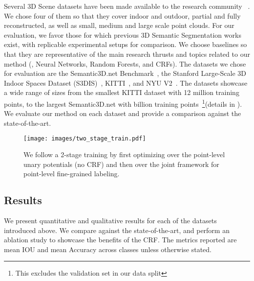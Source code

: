 \documentclass[10pt,twocolumn,letterpaper]{article}
\newcommand{\fccrf}[0]{CRF\xspace}
\begin{document}
Several 3D Scene datasets have been made available to the research community ~\cite{Riemenschneider2014,armeni2017,Armeni2016, scenenn-3dv16, Song2015,Xiao2013,Silberman:ECCV12,dai2017scannet,kitchen2016, catdata2013}. We chose four of them so that they cover indoor and outdoor, partial and fully reconstructed, as well as small, medium and large scale point clouds. For our evaluation, we favor those for which previous 3D Semantic Segmentation works exist, with replicable experimental setups for comparison. We choose baselines so that they are representative of the main research thrusts and topics related to our method (\ie, Neural Networks, Random Forests, and CRFs). The datasets we chose for evaluation are the Semantic3D.net Benchmark~\cite{l3d},
the Stanford Large-Scale 3D Indoor Spaces Dataset (S3DIS)~\cite{Armeni2016},  KITTI~\cite{Geiger2013IJRR,Geiger:2012:WRA:2354409.2354978}, and NYU V2~\cite{Silberman:ECCV12}.
The datasets showcase a wide range of sizes from the smallest
KITTI dataset with 12 million
training points, to the largest Semantic3D.net with  billion training points~\footnote{This excludes the validation set in our data split}(details in \cite{segcloudsuppl}). We evaluate our method on each dataset and provide a comparison against the state-of-the-art.


\begin{figure}[t]
\centering
\texttt{[image: images/two\_stage\_train.pdf]}
\caption{\small{We follow a 2-stage training by first optimizing over the point-level unary potentials (no CRF) and then over the joint framework for point-level fine-grained labeling.}}
\label{fig:training_stages}
\vspace{-4mm}
\end{figure}

\subsection{Results}
\label{sec:results}

We present quantitative and qualitative results for each of the datasets introduced above. We compare against the state-of-the-art, and perform an ablation study to showcase the benefits of the \fccrf. The metrics reported are mean IOU and mean Accuracy across classes unless otherwise stated.\\
\end{document}
